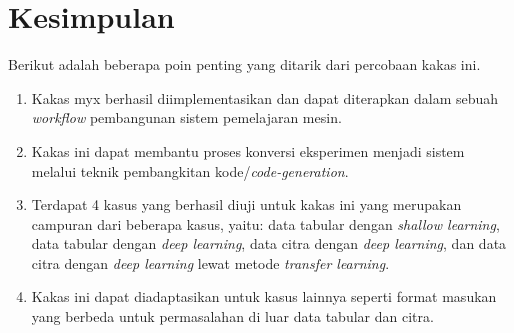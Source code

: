 \section{Kesimpulan}

Berikut adalah beberapa poin penting yang ditarik dari percobaan kakas ini.

\begin{enumerate}
    \item Kakas myx berhasil diimplementasikan dan dapat diterapkan dalam sebuah \textit{workflow} pembangunan sistem pemelajaran mesin.
    \item Kakas ini dapat membantu proses konversi eksperimen menjadi sistem melalui teknik pembangkitan kode/\textit{code-generation}.
    \item Terdapat 4 kasus yang berhasil diuji untuk kakas ini yang merupakan campuran dari beberapa kasus, yaitu: data tabular dengan \textit{shallow learning}, data tabular dengan \textit{deep learning}, data citra dengan \textit{deep learning}, dan data citra dengan \textit{deep learning} lewat metode \textit{transfer learning}.
    \item Kakas ini dapat diadaptasikan untuk kasus lainnya seperti format masukan yang berbeda untuk permasalahan di luar data tabular dan citra.
\end{enumerate}
